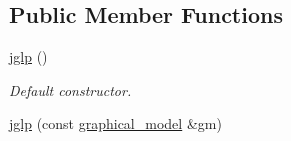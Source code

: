 \subsection*{Public Member Functions}
\begin{DoxyCompactItemize}
\item 
\hyperlink{classmerlin_1_1jglp_aa6fa80d5245138810714337e621567f7}{jglp} ()\hypertarget{classmerlin_1_1jglp_aa6fa80d5245138810714337e621567f7}{}\label{classmerlin_1_1jglp_aa6fa80d5245138810714337e621567f7}

\begin{DoxyCompactList}\small\item\em Default constructor. \end{DoxyCompactList}\item 
\hyperlink{classmerlin_1_1jglp_ad3b225e0288d9a911a5e8badcbc53e73}{jglp} (const \hyperlink{classmerlin_1_1graphical__model}{graphical\+\_\+model} \&gm)\hypertarget{classmerlin_1_1jglp_ad3b225e0288d9a911a5e8badcbc53e73}{}\label{classmerlin_1_1jglp_ad3b225e0288d9a911a5e8badcbc53e73}


\end{DoxyCompactItemize}
